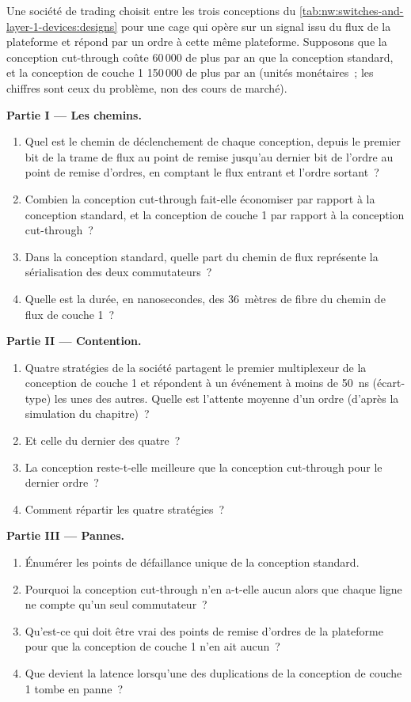 \begin{problem}\label{pb:nw:switches-and-layer-1-devices:1}
Une société de trading choisit entre les trois conceptions du \cref{tab:nw:switches-and-layer-1-devices:designs} pour une cage qui opère sur un signal
issu du flux de la plateforme et répond par un ordre à cette même plateforme. Supposons que la conception cut-through coûte 60\,000 de plus par an
que la conception standard, et la conception de couche 1 150\,000 de plus par an (unités monétaires~; les chiffres sont ceux du problème, non
des cours de marché).

\medskip\noindent\textbf{Partie I --- Les chemins.}
\begin{enumerate}
\item Quel est le chemin de déclenchement de chaque conception, depuis le premier bit de la trame de flux au point de remise jusqu'au dernier bit de l'ordre au
  point de remise d'ordres, en comptant le flux entrant et l'ordre sortant~?
\item Combien la conception cut-through fait-elle économiser par rapport à la conception standard, et la conception de couche 1 par rapport à la conception cut-through~?
\item Dans la conception standard, quelle part du chemin de flux représente la sérialisation des deux commutateurs~?
\item Quelle est la durée, en nanosecondes, des 36~mètres de fibre du chemin de flux de couche 1~?
\end{enumerate}

\medskip\noindent\textbf{Partie II --- Contention.}
\begin{enumerate}[resume]
\item Quatre stratégies de la société partagent le premier multiplexeur de la conception de couche 1 et répondent à un événement à moins de
  \qty{50}{\nano\second} (écart-type) les unes des autres. Quelle est l'attente moyenne d'un ordre (d'après la simulation du chapitre)~?
\item Et celle du dernier des quatre~?
\item La conception reste-t-elle meilleure que la conception cut-through pour le dernier ordre~?
\item Comment répartir les quatre stratégies~?
\end{enumerate}

\medskip\noindent\textbf{Partie III --- Pannes.}
\begin{enumerate}[resume]
\item Énumérer les points de défaillance unique de la conception standard.
\item Pourquoi la conception cut-through n'en a-t-elle aucun alors que chaque ligne ne compte qu'un seul commutateur~?
\item Qu'est-ce qui doit être vrai des points de remise d'ordres de la plateforme pour que la conception de couche 1 n'en ait aucun~?
\item Que devient la latence lorsqu'une des duplications de la conception de couche 1 tombe en panne~?
\end{enumerate}


\end{problem}
